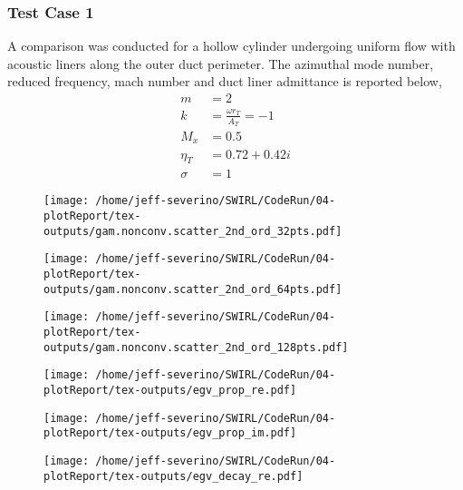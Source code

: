 \subsubsection{Test Case 1}
A comparison was conducted for a hollow cylinder undergoing uniform flow with
acoustic liners along the outer duct perimeter. The azimuthal mode number, reduced 
frequency, mach number and duct liner admittance is reported below,
\begin{align*}
    m &= 2 \\
    k &= \frac{\omega r_T}{A_T} = -1 \\
    M_x &= 0.5 \\
    \eta_T &= 0.72 + 0.42i\\
    \sigma &= 1
\end{align*} 

\begin{figure}[h!]
    \centering
    \texttt{[image: /home/jeff-severino/SWIRL/CodeRun/04-plotReport/tex-outputs/gam.nonconv.scatter\_2nd\_ord\_32pts.pdf]}
\end{figure}

\begin{figure}[h!]
    \centering
    \texttt{[image: /home/jeff-severino/SWIRL/CodeRun/04-plotReport/tex-outputs/gam.nonconv.scatter\_2nd\_ord\_64pts.pdf]}
\end{figure}


\begin{figure}[h!]
    \centering
    \texttt{[image: /home/jeff-severino/SWIRL/CodeRun/04-plotReport/tex-outputs/gam.nonconv.scatter\_2nd\_ord\_128pts.pdf]}
\end{figure}

\begin{figure}[h!]
    \centering
    \texttt{[image: /home/jeff-severino/SWIRL/CodeRun/04-plotReport/tex-outputs/egv\_prop\_re.pdf]}
    \label{fig:prop_re}
\end{figure}

\begin{figure}[h!]
    \centering
    \texttt{[image: /home/jeff-severino/SWIRL/CodeRun/04-plotReport/tex-outputs/egv\_prop\_im.pdf]}
    \label{fig:prop_im}
\end{figure}

\begin{figure}[h!]
    \centering
    \texttt{[image: /home/jeff-severino/SWIRL/CodeRun/04-plotReport/tex-outputs/egv\_decay\_re.pdf]}
    \label{fig:decay_re} 
\end{figure}

